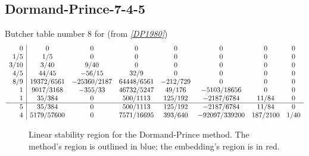 \documentclass[letterpaper,10pt,english]{sphinxmanual}
\begin{document}
\subsection{Dormand-Prince-7-4-5}
\label{Butcher:dormand-prince-7-4-5}\label{Butcher:butcher-dormand-prince}
Butcher table number 8
for {\hyperref[c_interface/User_callable:c.ARKodeSetERKTableNum]{\emph{}}} (from \label{Butcher:id8}{\hyperref[References:dp1980]{\emph{{[}DP1980{]}}}})
\begin{gather}
\begin{split}\begin{array}{r|ccccccc}
  0 & 0 & 0 & 0 & 0 & 0 & 0 & 0 \\
  1/5 & 1/5 & 0 & 0 & 0 & 0 & 0 & 0 \\
  3/10 & 3/40 & 9/40 & 0 & 0 & 0 & 0 & 0 \\
  4/5 & 44/45 & -56/15 & 32/9 & 0 & 0 & 0 & 0 \\
  8/9 & 19372/6561 & -25360/2187 & 64448/6561 & -212/729 & 0 & 0 & 0 \\
  1 & 9017/3168 & -355/33 & 46732/5247 & 49/176 & -5103/18656 & 0 & 0 \\
  1 & 35/384 & 0 & 500/1113 & 125/192 & -2187/6784 & 11/84 & 0 \\
  \hline
  5 & 35/384 & 0 & 500/1113 & 125/192 & -2187/6784 & 11/84 & 0 \\
  4 & 5179/57600 & 0 & 7571/16695 & 393/640 & -92097/339200 & 187/2100 & 1/40
\end{array}\end{split}\notag
\end{gather}\begin{figure}[htbp]
\centering
\capstart

\caption{Linear stability region for the Dormand-Prince method.  The method's
region is outlined in blue; the embedding's region is in red.}\end{figure}
\end{document}
